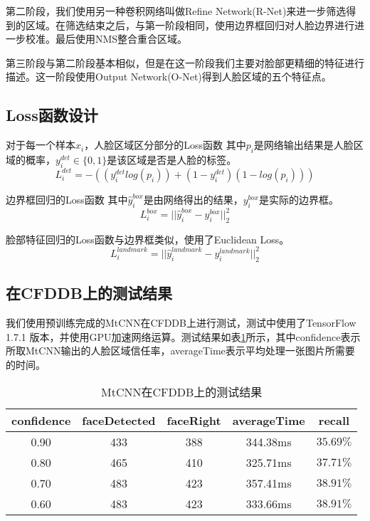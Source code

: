 第二阶段，我们使用另一种卷积网络叫做Refine Network(R-Net)来进一步筛选得到的区域。在筛选结束之后，与第一阶段相同，使用边界框回归对人脸边界进行进一步校准。最后使用NMS整合重合区域。

第三阶段与第二阶段基本相似，但是在这一阶段我们主要对脸部更精细的特征进行描述。这一阶段使用Output Network(O-Net)得到人脸区域的五个特征点。

\subsection{Loss函数设计}

对于每一个样本$x_i$，人脸区域区分部分的Loss函数 其中$p_i$是网络输出结果是人脸区域的概率，$y_i^{det}\in\{0,1\}$是该区域是否是人脸的标签\cite{zhang2016joint}。
\begin{equation}
	L_{i}^{det}=-((y_{i}^{det}log(p_{i}))+(1-y_{i}^{det})(1-log(p_i)))
\end{equation}



边界框回归的Loss函数 其中$\hat{y}_i^{box}$是由网络得出的结果，$y_i^{box}$是实际的边界框\cite{zhang2016joint}。
\begin{equation}
	L_{i}^{box}=||{\hat{y}_i^{box}-y_i^{box}}||_2^2
\end{equation}



脸部特征回归的Loss函数与边界框类似，使用了Euclidean Loss\cite{zhang2016joint}。
\begin{equation}
L_{i}^{landmark}=||{\hat{y}_i^{landmark}-y_i^{landmark}}||_2^2
\end{equation}



\subsection{在CFDDB上的测试结果}

我们使用预训练完成的MtCNN在CFDDB上进行测试，测试中使用了TensorFlow 1.7.1 版本，并使用GPU加速网络运算。测试结果如表\ref{tab:mtcnn}所示，其中confidence表示所取MtCNN输出的人脸区域信任率，averageTime表示平均处理一张图片所需要的时间。

\begin{table}[!hpb]
	\centering
	\caption{MtCNN在CFDDB上的测试结果}
	\label{tab:mtcnn}
	\begin{tabular}{ cccc | c }
		\hline
		confidence & faceDetected & faceRight & averageTime & recall\\
		\hline
		0.90 & 433 & 388 & 344.38ms & $35.69\%$\\
		0.80 & 465 & 410 & 325.71ms & $37.71\%$\\
		0.70 & 483 & 423 & 357.41ms & $38.91\%$\\
		0.60 & 483 & 423 & 333.66ms & $38.91\%$\\
		\hline
	\end{tabular}
\end{table}

